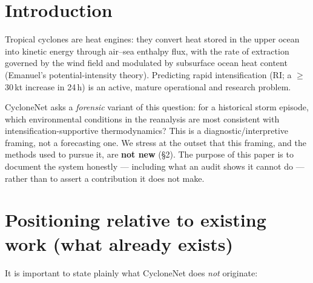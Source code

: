 \documentclass[11pt]{article}
\begin{document}
\begin{abstract}
The audit's central reproducibility failure --- headline metrics (ROC-AUC 0.83)
obtained on an unreleased dataset --- is resolved in this revision by releasing
the full \textbf{1980--2023} dataset (16{,}780 events, 802 RI positives, 992
storms) built by a windowed, checksummed pipeline, and retraining
deterministically on it. On the held-out test split (2{,}679 events, 115 RI
positives) the classifier achieves \textbf{ROC-AUC 0.796 [95\% CI
0.753--0.837]} and \textbf{PR-AUC 0.251 [0.179--0.331]} at the test split's
4.3\% prevalence --- the first version of this project whose skill is statistically
distinguishable from chance, and the confirmation-by-intervention of the
audit's diagnostic that sample size, not architecture, was the bottleneck.
The negative results on spatial attribution stand and are strengthened by two
additional controls. We present this as a reproducible baseline and as a
caution against overclaiming in physics-guided cyclone ML.
\end{abstract}

\section{Introduction}

Tropical cyclones are heat engines: they convert heat stored in the upper
ocean into kinetic energy through air--sea enthalpy flux, with the rate of
extraction governed by the wind field and modulated by subsurface ocean heat
content (Emanuel's potential-intensity theory). Predicting rapid
intensification (RI; a $\geq$30\,kt increase in 24\,h) is an active, mature
operational and research problem.

CycloneNet asks a \emph{forensic} variant of this question: for a historical
storm episode, which environmental conditions in the reanalysis are most
consistent with intensification-supportive thermodynamics? This is a
diagnostic/interpretive framing, not a forecasting one. We stress at the
outset that this framing, and the methods used to pursue it, are \textbf{not
new} (\S2). The purpose of this paper is to document the system honestly ---
including what an audit shows it cannot do --- rather than to assert a
contribution it does not make.

\section{Positioning relative to existing work (what already exists)}

It is important to state plainly what CycloneNet does \emph{not} originate:
\end{document}
